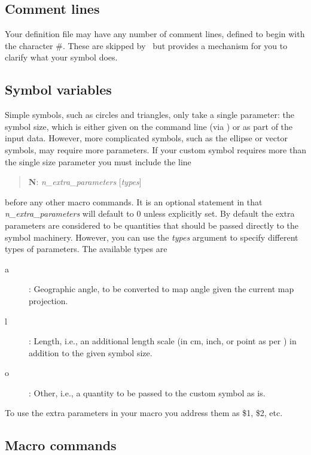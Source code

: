 \subsection{Comment lines}

Your definition file may have any number of comment lines, defined to begin with
the character \#.  These are skipped by \GMT\ but provides a mechanism for you to
clarify what your symbol does.

\subsection{Symbol variables}

Simple symbols, such as circles and triangles, only take a single parameter: the
symbol size, which is either given on the command line (via ) or as part
of the input data.  However, more complicated symbols, such as the ellipse or vector symbols,
may require more parameters.  If your custom symbol requires more than the single size parameter
you must include the line
\begin{quote}
	\textbf{N}: \emph{n\_extra\_parameters} [\emph{types}]
\end{quote}
before any other macro commands.  It is an optional statement in that \emph{n\_extra\_parameters} will
default to 0 unless explicitly set.  By default the extra parameters are considered to be quantities
that should be passed directly to the symbol machinery.  However, you can use the \emph{types} argument
to specify different types of parameters.  The available types are
\begin{description}
	\item [a]: Geographic angle, to be converted to map angle given the current map projection.
	\item [l]: Length, i.e., an additional length scale (in cm, inch, or point as per ) in addition to the given symbol size.
	\item [o]: Other, i.e., a quantity to be passed to the custom symbol as is.
\end{description}
To use the extra parameters in your macro you address them as \$1, \$2, etc.

\subsection{Macro commands}

